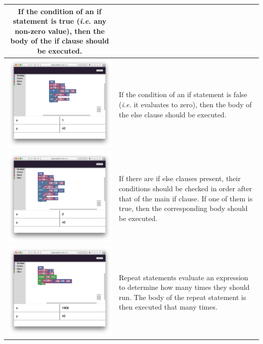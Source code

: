 \begin{center}
\begin{longtable}[t]{|c|p{5cm}|}
		If the condition of an if statement is true (\emph{i.e.} any non-zero value), then the body of the if clause should be executed. \\ \hline
		\includegraphics[align=t,width=250px]{cswk/4-else.png} &
		If the condition of an if statement is false (\emph{i.e.} it evaluates to zero), then the body of the else clause should be executed. \\ \hline 
		\includegraphics[align=t,width=250px]{cswk/5-ifelse.png} &
		If there are if else clauses present, their conditions should be checked in order after that of the main if clause. If one of them is true, then the corresponding body should be executed. \\ \hline
		\includegraphics[align=t,width=250px]{cswk/6-repeat.png} &
		Repeat statements evaluate an expression to determine how many times they should run. The body of the repeat statement is then executed that many times. \\ \hline 

\end{longtable}
\end{center}
